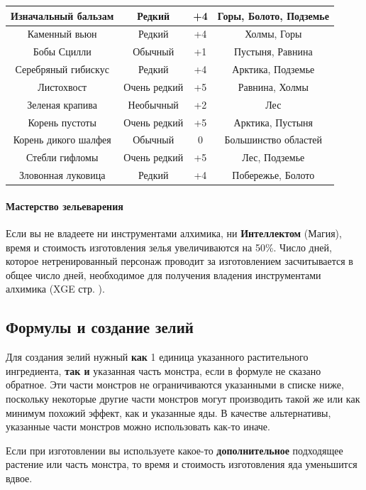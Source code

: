 \documentclass[a4paper, 9pt, twocolumn]{book}
\begin{document}
\begin{tabular}{|c|c|c|c|}
		\hline
		Изначальный бальзам & Редкий & +4 & Горы, Болото, Подземье \\
		\hline
		Каменный вьюн & Редкий & +4 & Холмы, Горы \\
		\hline
		Бобы Сцилли & Обычный & +1 & Пустыня, Равнина \\
		\hline
		Серебряный гибискус & Редкий & +4 & Арктика, Подземье \\
		\hline
		Листохвост & Очень редкий & +5 & Равнина, Холмы \\
		\hline
		Зеленая крапива & Необычный & +2 & Лес \\
		\hline
		Корень пустоты & Очень редкий & +5 & Арктика, Пустыня \\
		\hline
		Корень дикого шалфея & Обычный & 0 & Большинство областей \\
		\hline
		Стебли гифломы & Очень редкий & +5 & Лес, Подземье \\
		\hline
		Зловонная луковица & Редкий & +4 & Побережье, Болото \\
		\hline
	\end{tabular}

	\paragraph{Мастерство зельеварения}
	
	Если вы не владеете ни инструментами алхимика, ни \textbf{Интеллектом} (Магия), время и стоимость изготовления зелья увеличиваются на 50\%. Число дней, которое нетренированный персонаж проводит за изготовлением засчитывается в общее число дней, необходимое для получения владения инструментами алхимика (XGE стр. ). %
	
	\subsection{Формулы и создание зелий}
	
	Для создания зелий нужный \textbf{как} 1 единица указанного растительного ингредиента, \textbf{так и} указанная часть монстра, если в формуле не сказано обратное. Эти части монстров не ограничиваются указанными в списке ниже, поскольку некоторые другие части монстров могут производить такой же или как минимум похожий эффект, как и указанные яды. В качестве альтернативы, указанные части монстров можно использовать как-то иначе.
	
	Если при изготовлении вы используете какое-то \textbf{дополнительное} подходящее растение или часть монстра, то время и стоимость  изготовления яда уменьшится вдвое. 
	
\end{document}
